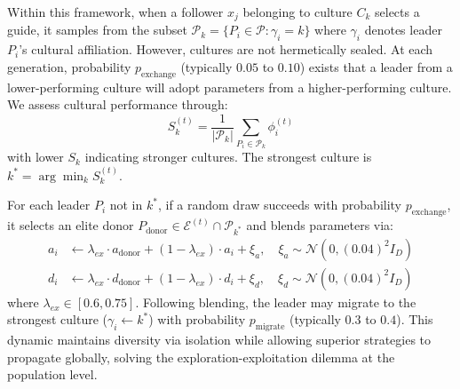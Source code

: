 \documentclass[11pt]{article}
\begin{document}
Within this framework, when a follower $x_j$ belonging to culture $C_k$ selects a guide, it samples from the subset $\mathcal{P}_k = \{P_i \in \mathcal{P} : \gamma_i = k\}$ where $\gamma_i$ denotes leader $P_i$'s cultural affiliation. However, cultures are not hermetically sealed. At each generation, probability $p_{\text{exchange}}$ (typically $0.05$ to $0.10$) exists that a leader from a lower-performing culture will adopt parameters from a higher-performing culture. We assess cultural performance through:
\begin{equation}
S_k^{(t)} = \frac{1}{|\mathcal{P}_k|} \sum_{P_i \in \mathcal{P}_k} \phi_i^{(t)}
\label{eq:culture_strength}
\end{equation}
with lower $S_k$ indicating stronger cultures. The strongest culture is $k^* = \arg\min_k S_k^{(t)}$.

For each leader $P_i$ not in $k^*$, if a random draw succeeds with probability $p_{\text{exchange}}$, it selects an elite donor $P_{\text{donor}} \in \mathcal{E}^{(t)} \cap \mathcal{P}_{k^*}$ and blends parameters via:
\begin{align}
a_i &\leftarrow \lambda_{ex} \cdot a_{\text{donor}} + (1-\lambda_{ex}) \cdot a_i + \xi_a, \quad \xi_a \sim \mathcal{N}(0, (0.04)^2 I_D) \\
d_i &\leftarrow \lambda_{ex} \cdot d_{\text{donor}} + (1-\lambda_{ex}) \cdot d_i + \xi_d, \quad \xi_d \sim \mathcal{N}(0, (0.04)^2 I_D)
\end{align}
where $\lambda_{ex} \in [0.6, 0.75]$. Following blending, the leader may migrate to the strongest culture ($\gamma_i \leftarrow k^*$) with probability $p_{\text{migrate}}$ (typically $0.3$ to $0.4$). This dynamic maintains diversity via isolation while allowing superior strategies to propagate globally, solving the exploration-exploitation dilemma at the population level.
\end{document}
